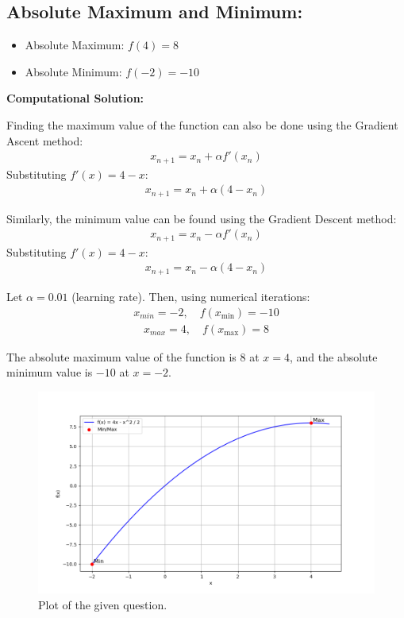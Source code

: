 \documentclass[journal]{IEEEtran}
\numberwithin{equation}{enumi}
\numberwithin{figure}{enumi}
\begin{document}
\subsection*{Absolute Maximum and Minimum:}
\begin{itemize}
    \item Absolute Maximum: $ f(4) = 8 $
    \item Absolute Minimum: $ f(-2) = -10 $
\end{itemize}

\textbf{Computational Solution:}

Finding the maximum value of the function can also be done using the Gradient Ascent method:
\begin{align}
x_{n+1} = x_n + \alpha f'(x_n)
\end{align}
Substituting $ f'(x) = 4 - x $:
\begin{align}
x_{n+1} = x_n + \alpha(4 - x_n)
\end{align}

Similarly, the minimum value can be found using the Gradient Descent method:
\begin{align}
x_{n+1} = x_n - \alpha f'(x_n)
\end{align}
Substituting $ f'(x) = 4 - x $:
\begin{align}
x_{n+1} = x_n - \alpha(4 - x_n)
\end{align}


Let $ \alpha = 0.01 $ (learning rate). Then, using numerical iterations:
\begin{align}
x_{min} = -2, \quad f(x_{\text{min}}) = -10
\end{align}
\begin{align}
x_{max} = 4, \quad f(x_{\text{max}}) = 8
\end{align}


The absolute maximum value of the function is $ 8 $ at $ x = 4 $, and the absolute minimum value is $ -10 $ at $ x = -2 $.
\begin{figure}[h]
\centering
\includegraphics[width=\columnwidth]{Figs/Figure_1.png}
\caption{Plot of the given question.}
\label{fig:Plot1} 
\end{figure}
\end{document}
